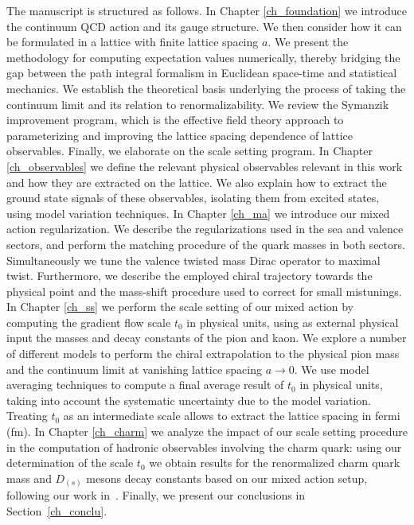 The manuscript is structured as follows. In Chapter \ref{ch_foundation} we introduce the continuum QCD action and its gauge structure. We then consider how it can be formulated in a lattice with finite lattice spacing $a$. We present the methodology for computing expectation values numerically, thereby bridging the gap between the path integral formalism in Euclidean space-time and statistical mechanics. We establish the theoretical basis underlying the process of taking the continuum limit and its relation to renormalizability. We review the Symanzik improvement program, which is the effective field theory approach to parameterizing and improving the lattice spacing dependence of lattice observables. Finally, we elaborate on the scale setting program. In Chapter \ref{ch_observables} we define the relevant physical observables relevant in this work and how they are extracted on the lattice. We also explain how to extract the ground state signals of these observables, isolating them from excited states, using model variation techniques. In Chapter \ref{ch_ma} we introduce our mixed action regularization. We describe the regularizations used in the sea and valence sectors, and perform the matching procedure of the quark masses in both sectors. Simultaneously we tune the valence twisted mass Dirac operator to maximal twist. Furthermore, we describe the employed chiral trajectory towards the physical point and the mass-shift procedure used to correct for small mistunings. In Chapter \ref{ch_ss} we perform the scale setting of our mixed action by computing the gradient flow scale $t_0$ in physical units, using as external physical input the masses and decay constants of the pion and kaon. We explore a number of different models to perform the chiral extrapolation to the physical pion mass and the continuum limit at vanishing lattice spacing $a\to0$. We use model averaging techniques to compute a final average result of $t_0$ in physical units, taking into account the systematic uncertainty due to the model variation. Treating $t_0$ as an intermediate scale allows to extract the lattice spacing in fermi (fm). In Chapter \ref{ch_charm} we analyze the impact of our scale setting procedure in the computation of hadronic observables involving the charm quark: using our determination of the scale $t_0$ we obtain results for the renormalized charm quark mass and $D_{(s)}$ mesons decay constants based on our mixed action setup, following our work in~\citep{charm}. Finally, we present our conclusions in Section~\ref{ch_conclu}.

